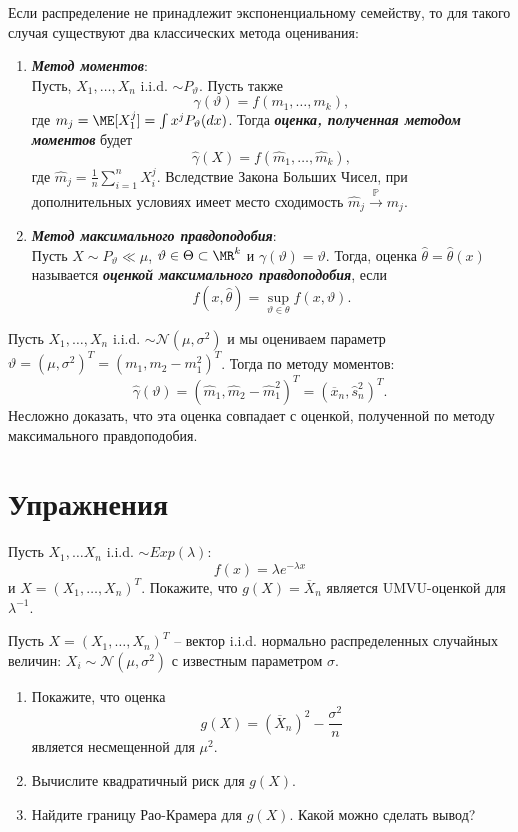 \begin{rmrk} \label{rmrk2.41}
	Если распределение не принадлежит экспоненциальному семейству, то для такого случая существуют два классических метода оценивания:
	\begin{enumerate}
		\item \textbf{\textit{Метод моментов}}: \\
		Пусть, $X_1, \dots, X_n$ i.i.d. $\sim P_\vartheta$. Пусть также
		 \[\gamma(\vartheta) = f(m_1, \dots, m_k),\]
		  где $m_j = \ME[X_1^j] = \int x^j P_\vartheta(dx)$. Тогда \textbf{\textit{оценка, полученная методом моментов}} будет
		  \[\hat\gamma(X) = f(\hat m_1, \dots, \hat m_k),\]
		  где $\hat m_j = \frac{1}{n}\sum_{i = 1}^n X_i^j.$ Вследствие Закона Больших Чисел, при дополнительных условиях имеет место сходимость $\hat m_j\xrightarrow{\mathbb{P}} m_j$.
		\item \textbf{\textit{Метод максимального правдоподобия}}: \\
		Пусть $X \sim P_\vartheta \ll \mu $, $\vartheta \in \Theta \subset \MR^k$ и $\gamma(\vartheta) = \vartheta$. Тогда, оценка $\hat \theta = \hat \theta(x)$ называется \textbf{\textit{оценкой максимального правдоподобия}}, если
		\[ f(x, \hat \theta) = \sup_{\vartheta \in \theta} f(x, \vartheta). \]
	\end{enumerate}
\end{rmrk}
\begin{exmp}
	Пусть $X_1, \dots, X_n$ i.i.d. $\sim \mathcal{N}(\mu, \sigma^2)$ и мы оцениваем параметр $\vartheta = (\mu, \sigma^2)^T = (m_1, m_2-m_1^2)^T$. Тогда по методу моментов:
	\[\hat{\gamma}(\vartheta)=(\hat{m}_1, \hat{m}_2-\hat{m}_1^2)^T=(\overline{x}_n, \hat{s}_n^2)^T. \]
	Несложно доказать, что эта оценка совпадает с оценкой, полученной по методу максимального правдоподобия.
\end{exmp}

\raggedbottom
\pagebreak

\section*{Упражнения}

\begin{exc}
	Пусть $X_1, \dots X_n$ i.i.d. $\sim Exp(\lambda)$:
	\[ f(x) = \lambda e^{-\lambda x}  \]
	и $X = (X_1, \dots, X_n)^T$. Покажите, что $g(X) = \overline{X}_n$ является UMVU-оценкой для $\lambda^{-1}$.
\end{exc}

\begin{exc}
	Пусть $X = (X_1, \dots, X_n)^T$ -- вектор i.i.d. нормально распределенных случайных величин: $X_i \sim \mathcal{N}(\mu, \sigma^2)$ с известным параметром $\sigma$.
	\begin{enumerate}
		\item Покажите, что оценка
		\[ g(X) = (\overline{X}_n)^2-\frac{\sigma^2}{n} \]
		является несмещенной для $\mu^2$.
		\item Вычислите квадратичный риск для $g(X)$.
	    \item Найдите границу Рао-Крамера для $g(X)$. Какой можно сделать вывод?
	\end{enumerate}
\end{exc}

